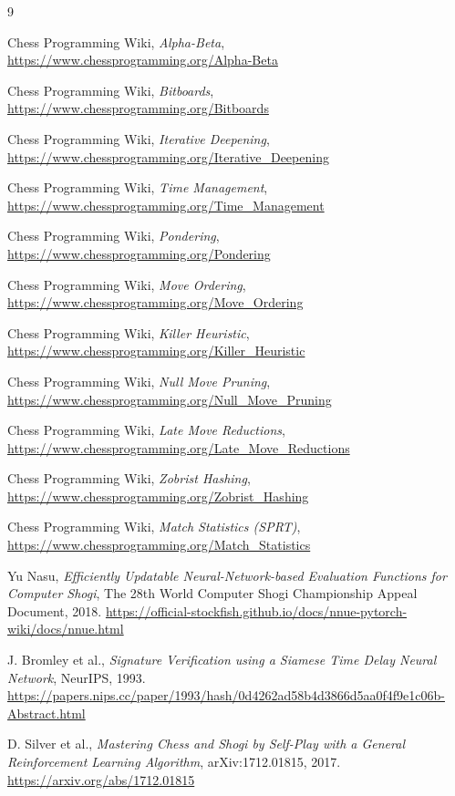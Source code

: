 \documentclass[12pt,a4paper]{article}
\begin{document}
\newpage
\begin{thebibliography}{9}

Chess Programming Wiki,
\textit{Alpha-Beta},
\url{https://www.chessprogramming.org/Alpha-Beta}

Chess Programming Wiki,
\textit{Bitboards},
\url{https://www.chessprogramming.org/Bitboards}

Chess Programming Wiki,
\textit{Iterative Deepening},
\url{https://www.chessprogramming.org/Iterative_Deepening}

Chess Programming Wiki,
\textit{Time Management},
\url{https://www.chessprogramming.org/Time_Management}

Chess Programming Wiki,
\textit{Pondering},
\url{https://www.chessprogramming.org/Pondering}

Chess Programming Wiki,
\textit{Move Ordering},
\url{https://www.chessprogramming.org/Move_Ordering}

Chess Programming Wiki,
\textit{Killer Heuristic},
\url{https://www.chessprogramming.org/Killer_Heuristic}

Chess Programming Wiki,
\textit{Null Move Pruning},
\url{https://www.chessprogramming.org/Null_Move_Pruning}

Chess Programming Wiki,
\textit{Late Move Reductions},
\url{https://www.chessprogramming.org/Late_Move_Reductions}

Chess Programming Wiki,
\textit{Zobrist Hashing},
\url{https://www.chessprogramming.org/Zobrist_Hashing}

Chess Programming Wiki,
\textit{Match Statistics (SPRT)},
\url{https://www.chessprogramming.org/Match_Statistics}

Yu Nasu, \textit{Efficiently Updatable Neural-Network-based Evaluation Functions for Computer Shogi},
The 28th World Computer Shogi Championship Appeal Document, 2018.
\url{https://official-stockfish.github.io/docs/nnue-pytorch-wiki/docs/nnue.html}

J. Bromley et al.,
\textit{Signature Verification using a Siamese Time Delay Neural Network},
NeurIPS, 1993.
\url{https://papers.nips.cc/paper/1993/hash/0d4262ad58b4d3866d5aa0f4f9e1c06b-Abstract.html}

D. Silver et al.,
\textit{Mastering Chess and Shogi by Self-Play with a General Reinforcement Learning Algorithm},
arXiv:1712.01815, 2017.
\url{https://arxiv.org/abs/1712.01815}

\end{thebibliography}
\end{document}

